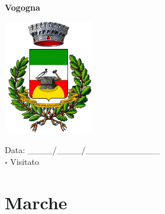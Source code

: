 \documentclass[a5paper,12pt]{article}
\begin{document}
\vspace{0.7cm}

\noindent
\begin{minipage}[t]{0.45\textwidth}
    \begin{center}
        \textbf{Vogogna}
    \end{center}
    \vspace{-0.5cm} %
    \begin{center}
        \includegraphics[height= 5cm, width=4cm]{Piemonte/Stemma Vogogna.png}
    \end{center}
    \vspace{-0.4cm} %
    \begin{flushleft}
        Data: \_\_\_\_/\_\_\_\_/\_\_\_\_\_\_\_\_\_\_\_\_ \\
        $\square$ Visitato
    \end{flushleft}
\end{minipage}

\newpage

\section*{Marche}

\newpage
\end{document}
